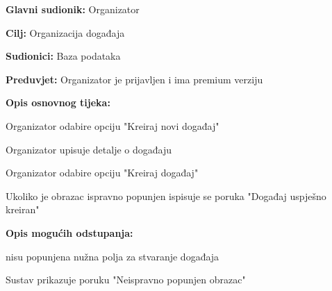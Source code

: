 					\noindent {}
					\begin{packed_item}
	
						\item \textbf{Glavni sudionik:} Organizator
						\item  \textbf{Cilj:} Organizacija događaja
						\item  \textbf{Sudionici:} Baza podataka
						\item  \textbf{Preduvjet:} Organizator je prijavljen i ima premium verziju
						\item  \textbf{Opis osnovnog tijeka:}
						
						\item[] \begin{packed_enum}
	
							\item Organizator odabire opciju "Kreiraj novi događaj"
							\item Organizator upisuje detalje o događaju
							\item Organizator odabire opciju "Kreiraj događaj"
							\item Ukoliko je obrazac ispravno popunjen ispisuje se poruka "Događaj uspješno kreiran"

						\end{packed_enum}
						
						\item  \textbf{Opis mogućih odstupanja:}
						
						\item[] \begin{packed_item}
	
							\item[4.a] nisu popunjena nužna polja za stvaranje događaja
							\item[] \begin{packed_enum}
								
								\item Sustav prikazuje poruku "Neispravno popunjen obrazac"
								
							\end{packed_enum}
							
						\end{packed_item}
					\end{packed_item}

